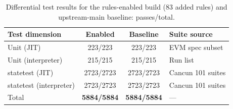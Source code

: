 \begin{table}[!htbp]
\centering
\caption{Differential test results for the rules-enabled build
(83 added rules) and upstream-main baseline: passes/total.}
\label{tab:correctness}
\footnotesize
\setlength{\tabcolsep}{3pt}
\begin{tabular}{@{}l c c p{2.6cm}@{}}
\toprule
Test dimension & Enabled & Baseline & Suite source \\
\midrule
Unit (JIT)              & 223/223   & 223/223   & EVM spec subset \\
Unit (interpreter)      & 215/215   & 215/215   & Run list \\
statetest (JIT)         & 2723/2723 & 2723/2723 & Cancun 101 suites \\
statetest (interpreter) & 2723/2723 & 2723/2723 & Cancun 101 suites \\
\midrule
Total & \textbf{5884/5884} & \textbf{5884/5884} & --- \\
\bottomrule
\end{tabular}
\end{table}
